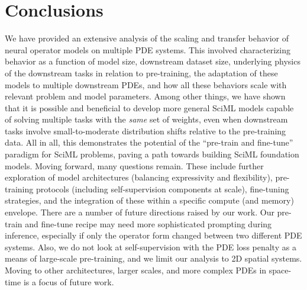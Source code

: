 \section{Conclusions}


We have provided an extensive analysis of the scaling and transfer behavior of neural operator models on multiple PDE systems.
%
This involved characterizing behavior as a function of 
model size,
downstream dataset size, 
underlying physics of the downstream tasks in relation to pre-training, 
the adaptation of these models to multiple downstream PDEs, and 
how all these behaviors scale with relevant problem and model parameters.
%
Among other things, we have shown that it is possible and beneficial to develop more general SciML models capable of solving multiple tasks with the \emph{same} set of weights, even when downstream tasks involve small-to-moderate distribution shifts relative to the pre-training data. 
%
All in all, this demonstrates the potential of the ``pre-train and fine-tune'' paradigm for SciML problems, paving a path towards building SciML foundation models.
%
Moving forward, many questions remain. 
These include further exploration of model architectures (balancing expressivity and flexibility), pre-training protocols (including self-supervision components at scale), fine-tuning strategies, and the integration of these within a specific compute (and memory) envelope. 
%
%
There are a number of future directions raised by our work.
Our pre-train and fine-tune recipe may need more sophisticated prompting during inference, especially if only the operator form changed between two different PDE systems. 
Also, we do not look at self-supervision with the PDE loss penalty as a means of large-scale pre-training, and we limit our analysis to 2D spatial systems.
Moving to other architectures, larger scales, and more complex PDEs in space-time is a focus of future work.

